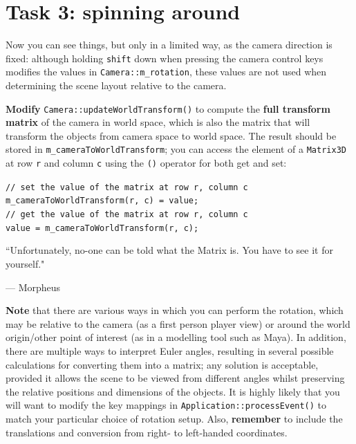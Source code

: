 \documentclass{../../../fal_assignment}
\begin{document}
\section*{Task 3: spinning around}

Now you can see things, but only in a limited way, as the camera direction is fixed: although holding \lstinline{shift} down when pressing the camera control keys modifies the values in \lstinline{Camera::m_rotation}, these values are not used when determining the scene layout relative to the camera.

\textbf{Modify} \lstinline{Camera::updateWorldTransform()} to compute the \textbf{full transform matrix} of the camera in world space, which is also the matrix that will transform the objects from camera space to world space. The result should be stored in \lstinline{m_cameraToWorldTransform}; you can access the element of a \lstinline{Matrix3D} at row \lstinline{r} and column \lstinline{c} using the \lstinline{()} operator for both get and set:

\hspace*{10mm}\lstinline{// set the value of the matrix at row r, column c}\\
\hspace*{10mm}\lstinline{m_cameraToWorldTransform(r, c) = value;}\\
\hspace*{10mm}\lstinline{// get the value of the matrix at row r, column c}\\
\hspace*{10mm}\lstinline{value = m_cameraToWorldTransform(r, c);}
\begin{marginquote}
``Unfortunately, no-one can be told what the Matrix is. You have to see it for yourself."
\par --- Morpheus
\end{marginquote}

\textbf{Note} that there are various ways in which you can perform the rotation, which may be relative to the camera (as a first person player view) or around the world origin/other point of interest (as in a modelling tool such as Maya). In addition, there are multiple ways to interpret Euler angles, resulting in several possible calculations for converting them into a matrix; any solution is acceptable, provided it allows the scene to be viewed from different angles whilst preserving the relative positions and dimensions of the objects. It is highly likely that you will want to modify the key mappings in \lstinline{Application::processEvent()} to match your particular choice of rotation setup. Also, \textbf{remember} to include the translations and conversion from right- to left-handed coordinates.
\end{document}

